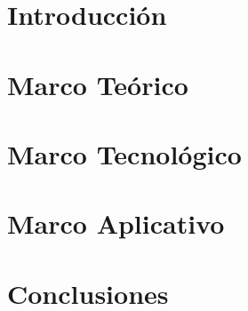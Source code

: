 \documentclass[12pt]{report}
\begin{document}
\tableofcontents

\listoffigures

\chapter{Introducción}


\chapter{Marco Teórico}


\chapter{Marco Tecnológico}


\chapter{Marco Aplicativo}


\chapter{Conclusiones}


\clearpage

\printbibliography
\end{document}
